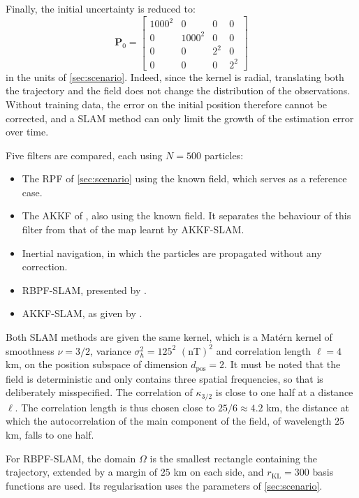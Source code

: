 Finally, the initial uncertainty is reduced to:
\begin{equation}
	\mathbf{P}_0=\begin{bmatrix}
	1000^2&0&0&0\\
	0&1000^2&0&0\\
	0&0&2^2&0\\
	0&0&0&2^2
	\end{bmatrix}
\end{equation}
in the units of \cref{sec:scenario}. Indeed, since the kernel is radial, translating both the trajectory and the field does not change the distribution of the observations. Without training data, the error on the initial position therefore cannot be corrected, and a SLAM method can only limit the growth of the estimation error over time.

Five filters are compared, each using $N=500$ particles:
\begin{itemize}
	\item The RPF of \cref{sec:scenario} using the known field, which serves as a reference case.
	\item The AKKF of , also using the known field. It separates the behaviour of this filter from that of the map learnt by AKKF-SLAM.
	\item Inertial navigation, in which the particles are propagated without any correction.
	\item RBPF-SLAM, presented by .
	\item AKKF-SLAM, as given by .
\end{itemize}

Both SLAM methods are given the same kernel, which is a Matérn kernel of smoothness $\nu=3/2$, variance $\sigma_h^2=125^2$ $(\text{nT})^2$ and correlation length $\ell=4$ km, on the position subspace of dimension $d_{\mathrm{pos}}=2$. It must be noted that the field is deterministic and only contains three spatial frequencies, so that  is deliberately misspecified. The correlation of $\kappa_{3/2}$ is close to one half at a distance $\ell$. The correlation length is thus chosen close to $25/6\approx4.2$ km, the distance at which the autocorrelation of the main component of the field, of wavelength $25$ km, falls to one half.

For RBPF-SLAM, the domain $\Omega$ is the smallest rectangle containing the trajectory, extended by a margin of $25$ km on each side, and $r_{\mathrm{KL}}=300$ basis functions are used. Its regularisation uses the parameters of \cref{sec:scenario}.

